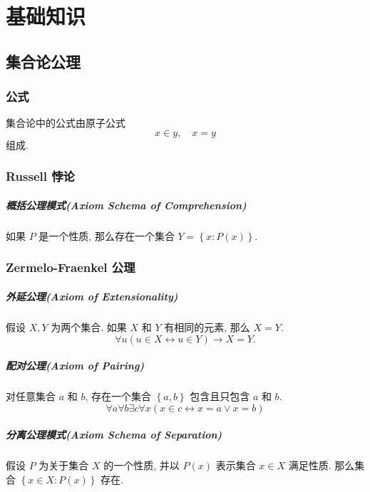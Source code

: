 \chapter{基础知识}

\section{集合论公理}

\subsection{公式}

集合论中的公式由原子公式
\[
  x \in y,\quad x = y
\]
组成.

\subsection{Russell 悖论}

\paragraph{概括公理模式(Axiom Schema of Comprehension)} 如果 \( P \) 是一个性质,
那么存在一个集合 \( Y = \left\lbrace x: P(x) \right\rbrace \).

\subsection{Zermelo-Fraenkel 公理}

\paragraph{外延公理(Axiom of Extensionality)} 假设 \( X, Y \) 为两个集合.
如果 \( X \) 和 \( Y \) 有相同的元素, 那么 \( X = Y \).
\[
  \forall u (u \in X \leftrightarrow u \in Y) \rightarrow X = Y.
\]

\paragraph{配对公理(Axiom of Pairing)} 对任意集合 \( a \) 和 \( b \),
存在一个集合 \( \left\lbrace a, b \right\rbrace \) 包含且只包含 \( a \) 和 \( b
\).
\[
  \forall a \forall b \exists c \forall x (x \in c \leftrightarrow x = a \vee
  x = b)
\]

\paragraph{分离公理模式(Axiom Schema of Separation)} 假设 \( P \) 为关于集合 \(
X \) 的一个性质, 并以 \( P(x) \) 表示集合 \( x \in X \) 满足性质.
那么集合 \( \left\lbrace x \in X: P(x) \right\rbrace \) 存在.

